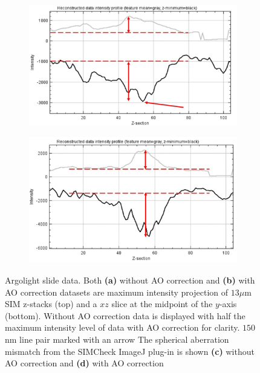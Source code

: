 \begin{figure}
	
	\begin{subfigure}[t]{0.45\textwidth}
		\centering
		\includegraphics[width=\linewidth]{images/Argolight_spherical_mismatch_woAO.jpg}
		\caption{}
		\label{fig:Argolight_spherical_mismatch_woAO}
	\end{subfigure}
	\begin{subfigure}[t]{0.45\textwidth}
		\centering
		\includegraphics[width=\linewidth]{images/Argolight_spherical_mismatch_AO.jpg}
		\caption{}
		\label{fig:Argolight_spherical_mismatch_AO}
	\end{subfigure}
	\caption[Argolight slide data]{Argolight slide data. Both \textbf{(a)} without AO correction and \textbf{(b)} with AO correction datasets 
		are maximum intensity projection of $13\mu$m SIM z-stacks (top) and  a $xz$ slice at the midpoint of the $y$-axis (bottom). Without AO correction data is displayed with half the maximum intensity level of data with AO correction for clarity. $150$nm line pair marked with an arrow The spherical aberration mismatch from the SIMCheck ImageJ plug-in\cite{ball2015simcheck} is shown \textbf{(c)} without AO correction and \textbf{(d)} with AO correction}
	\label{fig:Argolight_slide_both}
\end{figure}


